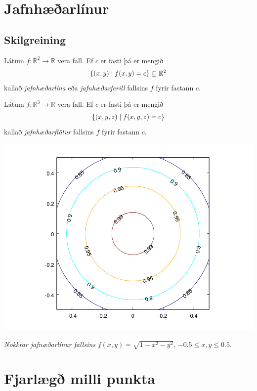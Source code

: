 \documentclass[a4paper,10pt,icelandic]{sphinxmanual}
\begin{document}
\section{Jafnhæðarlínur}
\label{Kafli2:jafnhaearlinur}

\subsection{Skilgreining}
\label{Kafli2:id1}\label{Kafli2:index-1}
Látum \(f:{\mathbb  R}^2\rightarrow {\mathbb  R}\) vera fall. Ef
\(c\) er fasti þá er mengið
\begin{gather}
\begin{split}\displaystyle \{(x,y)\mid f(x,y)=c\}\subseteq {\mathbb  R}^2\end{split}\notag
\end{gather}
kallað \textit{jafnhæðarlína} eða \textit{jafnhæðarferill} fallsins
\(f\) fyrir fastann \(c\).

Látum \(f:{\mathbb  R}^3\rightarrow {\mathbb  R}\) vera fall. Ef
\(c\) er fasti þá er mengið
\begin{gather}
\begin{split}\displaystyle \{(x,y,z)\mid f(x,y,z)=c\}\end{split}\notag
\end{gather}
kallað \textit{jafnhæðarflötur} fallsins \(f\) fyrir
fastann \(c\).

{\hfill\includegraphics[width=0.600\linewidth]{contour.png}\hfill}

\emph{Nokkrar jafnæðarlínur fallsins} \(f(x,y) = \sqrt{1-x^2-y^2}\), \(-0.5\leq x,y\leq 0.5\).


\section{Fjarlægð milli punkta}
\label{Kafli2:fjarlaeg-milli-punkta}
\end{document}
